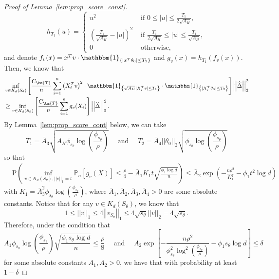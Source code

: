 \documentclass[ejsv2,noshowframe]{imsart}
\theoremstyle{plain}
\theoremstyle{definition}
\theoremstyle{remark}
\newcommand{\norm}[1]{\left|\left| #1 \right|\right|}
\renewcommand{\hat}{\widehat}
\begin{document}
\begin{proof}[Proof of Lemma~\ref{lem:prop_score_const}]
	\begin{equation}
		\label{trunc_func}
		h_{T_1}(u) = 
		\begin{cases}
			u^2 & \text{ if } 0\leq |u| \leq \frac{T_1}{2\sqrt{A_H}},\\
			\left(\frac{T_1}{\sqrt{A_H}} -|u| \right)^2 & \text{ if } \frac{T_1}{2\sqrt{A_H}} \leq |u| \leq \frac{T_1}{\sqrt{A_H}},\\
			0 & \text{ otherwise},
		\end{cases}
	\end{equation}
	and denote $f_v(x) = x^T v \cdot \mathbbm{1}_{\left\{|x^T \theta_0| \leq T_2\right\}}$ and $g_v(x) = h_{T_1}\left(f_v(x)\right)$. Then, we know that
	\begin{align*}
		&\inf_{v\in K_d(S_{\theta})}\left[\frac{C_{\bm{T}}}{n} \sum_{i=1}^n \left(X_i^Tv\right)^2 \cdot \mathbbm{1}_{\left\{\sqrt{A_H} |X_i^T v| \leq T_1 \right\}} \cdot \mathbbm{1}_{\left\{|X_i^T \theta_0| \leq T_2\right\}} \right] \norm{\hat{\Delta}}_2^2 \\
		&\geq \inf_{v\in K_d(S_{\theta})}\left[\frac{C_{\bm{T}}}{n} \sum_{i=1}^n g_v(X_i) \right] \norm{\hat{\Delta}}_2^2.
	\end{align*}
	By Lemma~\ref{lem:prop_score_cont} below, we can take 
	$$T_1= \bar{A}_3\sqrt{A_H \phi_{s_{\theta}}\log\left(\frac{\phi_{s_{\theta}}}{\rho} \right)} \quad \text{ and } \quad T_2 = \bar{A}_4 \norm{\theta_0}_2 \sqrt{\phi_{s_{\theta}}\log\left(\frac{\phi_{s_{\theta}}}{\rho} \right)}$$ 
	so that
	\begin{align*}
		&\mathrm{P}\left(\inf_{v\in K_d(S_{\theta}),\norm{v}_1=t} \mathbb{P}_n\left[g_v(X)\right] \leq \frac{\rho}{4}- \bar{A}_1 K_1 t\sqrt{\frac{\phi_1\log d}{n}} \right) \leq \bar{A}_2 \exp\left(-\frac{n\rho^2}{K_1^2} -\phi_1 t^2\log d\right)
	\end{align*}
	with $K_1=\bar{A}_3^2\phi_{s_{\theta}} \log\left(\frac{\phi_{s_{\theta}}}{\rho}\right)$, where $\bar{A}_1,\bar{A}_2,\bar{A}_3,\bar{A}_4>0$ are some absolute constants. Notice that for any $v\in K_d(S_{\theta})$, we know that
	$$1\leq \norm{v}_1\leq 4 \norm{v_{S_{\theta}}}_1 \leq 4\sqrt{s_{\theta}}\norm{v}_2 = 4\sqrt{s_{\theta}}.$$
	Therefore, under the condition that
	$$A_1\phi_{s_{\theta}} \log\left(\frac{\phi_{s_{\theta}}}{\rho}\right) \sqrt{\frac{\phi_1 s_{\theta}\log d}{n}} \leq \frac{\rho}{8} \quad \text{ and }\quad   A_2\exp\left[-\frac{n\rho^2}{\phi_{s_{\theta}}^2 \log^2\left(\frac{\phi_{s_{\theta}}}{\rho}\right)} - \phi_1 s_{\theta}\log d\right] \leq \delta$$
	for some absolute constants $A_1,A_2>0$, we have that with probability at least $1-\delta$

\end{proof}
\end{document}
